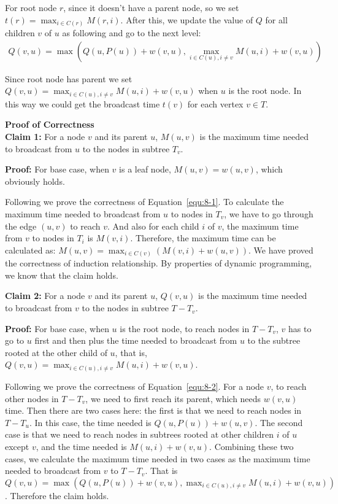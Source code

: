\documentclass{article}
\newcommand{\Proof}{\vspace{0.3cm} \noindent\textbf{Proof of Correctness} \vspace{0.2cm} \\}
\begin{document}
For root node $r$, since it doesn't have a parent node, so we set $t(r) =  \max_{i \in C(r)} M(r, i)$.
After this, we update the value of $Q$ for all children $v$ of $u$ as following and go to the next
level:
\begin{align}
  Q(v, u) = \max(Q(u, P(u))  + w(v, u), \max_{i \in C(u), i \neq v} M(u, i) + w(v, u))  
  \label{equ:8-2}
\end{align}

Since root node has parent we set $Q(v, u) =  \max_{i \in C(u), i \neq v} M(u, i) + w(v, u)$ when
$u$ is the root node.  
In this way we could get the broadcast time $t(v)$ for each vertex $v \in T$.

\Proof
\textbf{Claim 1:} 
For a node $v$ and its parent $u$, $M(u, v)$ is the maximum time needed to broadcast from $u$ to the
nodes in subtree $T_v$.

\textbf{Proof:} 
For base case, when $v$ is a leaf node,  $M(u, v) = w(u, v)$, which obviously holds.

Following we prove the correctness of Equation~\ref{equ:8-1}. To calculate the maximum time needed
to broadcast from $u$ to nodes in $T_v$, we have to go through the edge $(u, v)$ to reach $v$. 
And also for each child $i$ of $v$, the maximum time from $v$ to nodes in $T_i$ is $M(v, i)$. Therefore, the
maximum time can be calculated as: $ M(u, v) = \max_{i \in C(v)} (M(v, i) + w(u, v))$. We have
proved the correctness of induction relationship. By properties of dynamic programming, we know that
the claim holds.

\textbf{Claim 2:}
For a node $v$ and its parent $u$, $Q(v, u)$ is the maximum time needed to broadcast from $v$ to the
nodes in subtree $T - T_v$.

\textbf{Proof:}
For base case, when $u$ is the root node, to reach nodes in $T - T_v$, $v$ has to go to $u$ first and then plus the
time needed to broadcast from $u$ to the subtree rooted at the other child of $u$, that is, 
$Q(v, u) = \max_{i \in C(u), i \neq v} M(u, i) + w(v, u)$. 

Following we prove the correctness of Equation~\ref{equ:8-2}. For a node $v$, to reach other nodes
in $T - T_v$, we need to first reach its parent, which needs $w(v, u)$ time. Then there are two
cases here: the first is that we need to reach nodes in $T - T_u$. In this case, the time needed is
$Q(u, P(u)) + w(u, v)$. The second case is that we need to reach nodes in subtrees rooted at other
children $i$ of $u$ except $v$, and the time needed is $M(u, i) + w(v, u)$. Combining these two
cases, we calculate the maximum time needed in two cases as the maximum time needed to broadcast
from $v$ to $T - T_v$. That is 
  $Q(v, u) = \max(Q(u, P(u))  + w(v, u), \max_{i \in C(u), i \neq v} M(u, i) + w(v, u))$. Therefore
  the claim holds.
\end{document}
